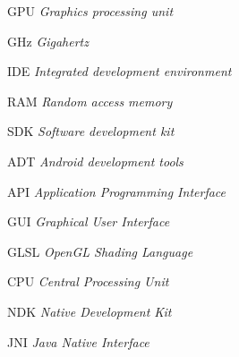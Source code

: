 \begin{siglas}
  \item[GPU] \textit{Graphics processing unit}
  \item[GHz] \textit{Gigahertz}
  \item[IDE] \textit{Integrated development environment}
  \item[RAM] \textit{Random access memory}
  \item[SDK] \textit{Software development kit}
  \item[ADT] \textit{Android development tools}
  \item[API] \textit{Application Programming Interface}
  \item[GUI] \textit{Graphical User Interface}
  \item[GLSL] \textit{OpenGL Shading Language}
  \item[CPU] \textit{Central Processing Unit}
  \item[NDK] \textit{Native Development Kit}
  \item[JNI] \textit{Java Native Interface}	


\end{siglas}

